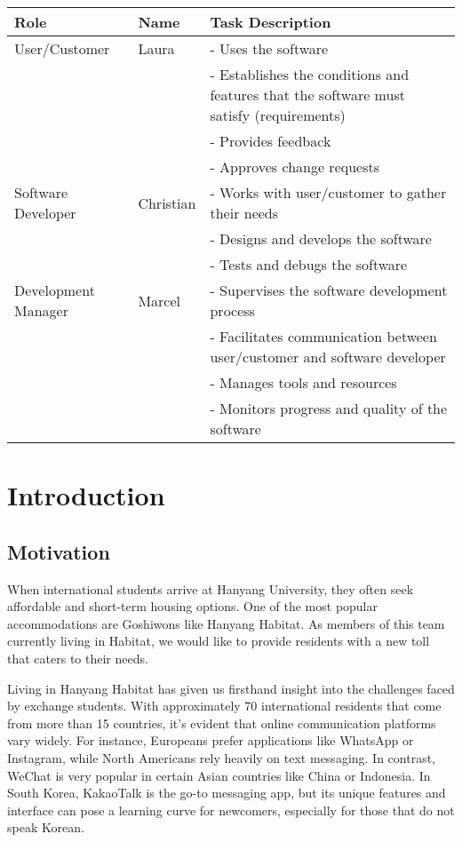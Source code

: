 \documentclass[conference]{IEEEtran}
\begin{document}
\begin{table}[htbp]
\centering
\begin{tabular}{|p{1.6cm}|l|p{3.6cm}|}
\hline
\textbf{Role} & \textbf{Name} & \textbf{Task Description}\\
\hline
User/Customer & Laura & 
- Uses the software \\
& & 
- Establishes the conditions and features that the software must satisfy (requirements) \\
& & 
- Provides feedback \\
& & 
- Approves change requests\\
\hline
Software Developer & Christian & 
- Works with user/customer to gather their needs \\
& & 
- Designs and develops the software \\
& & 
- Tests and debugs the software\\
\hline
Development Manager & Marcel & 
- Supervises the software development process \\
& & 
- Facilitates communication between user/customer and software developer \\
& & 
- Manages tools and resources \\
& & 
- Monitors progress and quality of the software\\
\hline
\end{tabular}
\end{table}


\section{Introduction}
\subsection{Motivation}
When international students arrive at Hanyang University, they often seek affordable and short-term housing options. One of the most popular accommodations are Goshiwons like Hanyang Habitat. As members of this team currently living in Habitat, we would like to provide residents with a new toll that caters to their needs.

Living in Hanyang Habitat has given us firsthand insight into the challenges faced by exchange students. With approximately 70 international residents that come from more than 15 countries, it's evident that online communication platforms vary widely. For instance, Europeans prefer applications like WhatsApp or Instagram, while North Americans rely heavily on text messaging. In contrast, WeChat is very popular in certain Asian countries like China or Indonesia. In South Korea, KakaoTalk is the go-to messaging app, but its unique features and interface can pose a learning curve for newcomers, especially for those that do not speak Korean.
\end{document}

